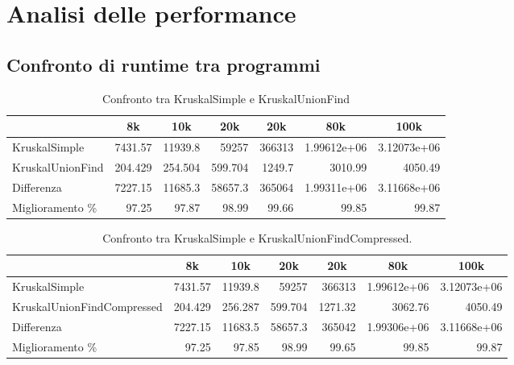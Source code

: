 \section{Analisi delle performance}
\label{cap:performance-analysis}

\subsection{Confronto di runtime tra programmi}

\begin{table}[h!]
\centering
    \begin{tabular}{|l|rrrrrr|}
    \hline
    &  \multicolumn{1}{c}{8k} & \multicolumn{1}{c}{10k} & \multicolumn{1}{c}{20k} & \multicolumn{1}{c}{20k} & \multicolumn{1}{c}{80k} &           \multicolumn{1}{c|}{100k} \\
    \hline
     KruskalSimple     & 7431.57  & 11939.8   & 59257     & 366313    &    1.99612e+06 &    3.12073e+06 \\
     KruskalUnionFind &  204.429 &   254.504 &   599.704 &   1249.7  & 3010.99        & 4050.49        \\ \hline
     Differenza       & 7227.15  & 11685.3   & 58657.3   & 365064    &    1.99311e+06 &    3.11668e+06 \\
     Miglioramento \%    &   97.25  &    97.87  &    98.99  &     99.66 &   99.85        &   99.87        \\
    \hline
    \end{tabular}
    \caption{Confronto tra KruskalSimple e KruskalUnionFind}
    \label{table:kruskal-simple-vs-kruskal-union-find}
\end{table}


\begin{table}[h!]
\centering
    \hspace*{-1cm}
    \begin{tabular}{|l|rrrrrr|}
    \hline
    &  \multicolumn{1}{c}{8k} & \multicolumn{1}{c}{10k} & \multicolumn{1}{c}{20k} & \multicolumn{1}{c}{20k} & \multicolumn{1}{c}{80k} &           \multicolumn{1}{c|}{100k} \\
    \hline
     KruskalSimple               & 7431.57  & 11939.8   & 59257     & 366313    &    1.99612e+06 &    3.12073e+06 \\
     KruskalUnionFindCompressed &  204.429 &   256.287 &   599.704 &   1271.32 & 3062.76        & 4050.49        \\ \hline
     Differenza                 & 7227.15  & 11683.5   & 58657.3   & 365042    &    1.99306e+06 &    3.11668e+06 \\
     Miglioramento \%              &   97.25  &    97.85  &    98.99  &     99.65 &   99.85        &   99.87        \\
    \hline
    \end{tabular}
    \caption{Confronto tra KruskalSimple e KruskalUnionFindCompressed.}
    \label{table:kruskal-simple-vs-kruskal-union-find-compressed}
\end{table}

